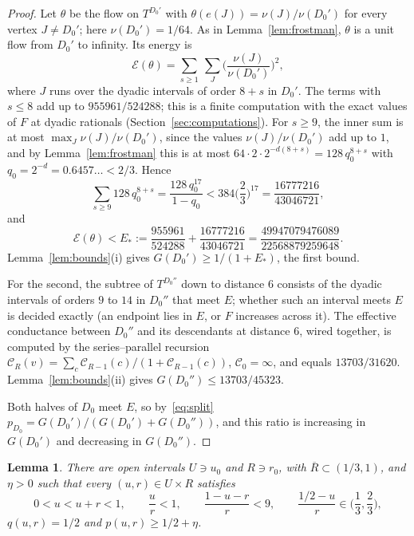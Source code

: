 \documentclass[11pt]{amsart}
\newtheorem{lemma}[theorem]{Lemma}
\theoremstyle{remark}
\begin{document}
\begin{proof}
Let $\theta$ be the flow on $T^{D_0'}$ with $\theta(e(J))=\nu(J)/\nu(D_0')$ for every vertex $J\ne D_0'$; here $\nu(D_0')=1/64$. As in Lemma~\ref{lem:frostman}, $\theta$ is a unit flow from $D_0'$ to infinity. Its energy is
\[
\mathcal E(\theta)=\sum_{s\ge1}\ \sum_{J}\Big(\frac{\nu(J)}{\nu(D_0')}\Big)^2,
\]
where $J$ runs over the dyadic intervals of order $8+s$ in $D_0'$. The terms with $s\le8$ add up to $955961/524288$; this is a finite computation with the exact values of $F$ at dyadic rationals (Section~\ref{sec:computations}). For $s\ge9$, the inner sum is at most $\max_J\nu(J)/\nu(D_0')$, since the values $\nu(J)/\nu(D_0')$ add up to $1$, and by Lemma~\ref{lem:frostman} this is at most $64\cdot 2\cdot2^{-d(8+s)}=128\,q_0^{8+s}$ with $q_0=2^{-d}=0.6457\ldots<2/3$. Hence
\[
\sum_{s\ge9}128\,q_0^{8+s}=\frac{128\,q_0^{17}}{1-q_0}<384\Big(\frac23\Big)^{17}=\frac{16777216}{43046721},
\]
and
\[
\mathcal E(\theta)<E_*:=\frac{955961}{524288}+\frac{16777216}{43046721}=\frac{49947079476089}{22568879259648}.
\]
Lemma~\ref{lem:bounds}(i) gives $G(D_0')\ge1/(1+E_*)$, the first bound.

For the second, the subtree of $T^{D_0''}$ down to distance $6$ consists of the dyadic intervals of orders $9$ to $14$ in $D_0''$ that meet $E$; whether such an interval meets $E$ is decided exactly (an endpoint lies in $E$, or $F$ increases across it). The effective conductance between $D_0''$ and its descendants at distance $6$, wired together, is computed by the series--parallel recursion $\mathcal C_R(v)=\sum_c\mathcal C_{R-1}(c)/(1+\mathcal C_{R-1}(c))$, $\mathcal C_0=\infty$, and equals $13703/31620$. Lemma~\ref{lem:bounds}(ii) gives $G(D_0'')\le 13703/45323$.

Both halves of $D_0$ meet $E$, so by~\eqref{eq:split} $p_{D_0}=G(D_0')/(G(D_0')+G(D_0''))$, and this ratio is increasing in $G(D_0')$ and decreasing in $G(D_0'')$.
\end{proof}

\begin{lemma}\label{lem:robust}
There are open intervals $U\ni u_0$ and $R\ni r_0$, with $\overline R\subset(1/3,1)$, and $\eta>0$ such that every $(u,r)\in U\times R$ satisfies
\begin{equation}\label{eq:margins}
0<u<u+r<1,\qquad \frac ur<1,\qquad\frac{1-u-r}{r}<9,\qquad\frac{1/2-u}{r}\in\Big(\frac13,\frac23\Big),
\end{equation}
$q(u,r)=1/2$ and $p(u,r)\ge1/2+\eta$.
\end{lemma}
\end{document}
